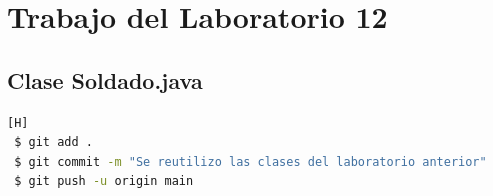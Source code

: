 \documentclass{article}
\newcommand{\itemPracticeNumber}{12}
\begin{document}
	\section{Trabajo del Laboratorio \itemPracticeNumber}
        
        



\subsection{Clase Soldado.java}
\begin{lstlisting}[language=bash,caption={Commit \href{https://github.com/hernanchoquehuanca/fp2-23b/commit/9172d39d5d2f0483636ab831e8a91cc9c228dee4}{9172d39}: Se reutilizo las clases del laboratorio anterior}][H]
 $ git add .
 $ git commit -m "Se reutilizo las clases del laboratorio anterior"			
 $ git push -u origin main
\end{lstlisting}
\end{document}
